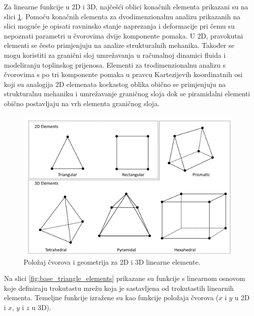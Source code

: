 \documentclass[a4paper,twoside,12pt]{memoir} %
\begin{document}
Za linearne funkcije u 2D i 3D, najčešći oblici konačnih elementa prikazani su na slici \ref{fig:2d_i_3d_elementi}. Pomoću konačnih elementa za dvodimenzionalnu analizu prikazanih na slici moguće je opisati ravninsko stanje naprezanja i deformacije pri čemu su nepoznati parametri u čvorovima dvije komponente pomaka. U 2D, pravokutni elementi se često primjenjuju na analize strukturalnih mehanika. Također se mogu koristiti za granični sloj umrežavanja u računalnoj dinamici fluida i modeliranju toplinskog prijenosa. Elementi za trodimenzionalnu analizu s čvorovima s po tri komponente pomaka u pravcu Kartezijevih koordinatnih osi koji su analogija 2D elemenata kockastog oblika obično se primjenjuju na strukturalnu mehaniku i umrežavanje graničnog sloja dok se piramidalni elementi obično postavljaju na vrh elementa graničnog sloja.

\begin{figure}[h!t]
\begin{center}
\includegraphics[scale=0.47]{pictures/chapter_fem/geometry-and-nodes-linear-elements.png}
\caption{Položaj čvorova i geometrija za 2D i 3D linearne elemente. \cite{comsol_fem_general}}
\label{fig:2d_i_3d_elementi}
\end{center}
\end{figure}

Na slici \ref{fig:base_triangle_elements} prikazane su funkcije s linearnom osnovom koje definiraju trokutastu mrežu koja je sastavljena od trokutastih linearnih elementa. Temeljne funkcije izražene su kao funkcije položaja čvorova ($x$ i $y$ u 2D i $x$, $y$ i $z$ u 3D).
\end{document}
